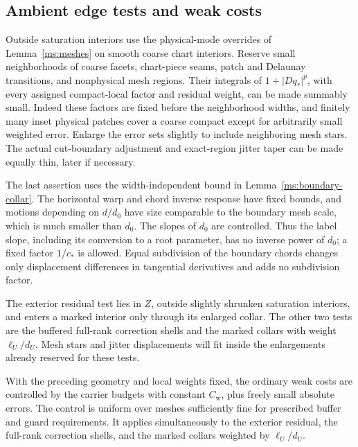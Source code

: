 \subsection{Ambient edge tests and weak costs}
\label{ha:weak-costs}

Outside saturation interiors use the physical-mode overrides of
Lemma~\ref{ms:meshes} on smooth coarse chart interiors.  Reserve small
neighborhoods of coarse facets, chart-piece seams, patch and Delaunay
transitions, and nonphysical mesh regions.  Their integrals of
$1+|Dq_*|^p$, with every assigned compact-local factor and residual
weight, can be made summably small.  Indeed these factors are fixed
before the neighborhood widths, and finitely many inset physical
patches cover a coarse compact except for arbitrarily small weighted
error.  Enlarge the error sets slightly to include neighboring mesh
stars.  The actual cut-boundary adjustment and exact-region jitter
taper can be made equally thin, later if necessary.

The last assertion uses the width-independent bound in
Lemma~\ref{ms:boundary-collar}.  The horizontal warp and chord inverse
response have fixed bounds, and motions depending on $d/d_0$ have
size comparable to the boundary mesh scale, which is much smaller
than $d_0$.  The slopes of $d_0$ are controlled.  Thus the label
slope, including its conversion to a root parameter, has no inverse
power of $d_0$; a fixed factor $1/c_*$ is allowed.  Equal subdivision
of the boundary chords changes only displacement differences in
tangential derivatives and adds no subdivision factor.

The exterior residual test lies in $Z$, outside slightly shrunken
saturation interiors, and enters a marked interior only through
its enlarged collar.  The other two tests are the buffered
full-rank correction shells and the marked collars with weight
$\ell_U/d_U$.  Mesh stars and jitter displacements will fit inside
the enlargements already reserved for these tests.

\begin{lemma}\label{ha:ambient-tests}
With the preceding geometry and local weights fixed, the ordinary
weak costs are controlled by the carrier budgets with constant
$C_{\mathrm w}$, plus freely small absolute errors.  The control is
uniform over meshes sufficiently fine for prescribed buffer and
guard requirements.  It applies simultaneously to the exterior
residual, the full-rank correction shells, and the marked collars
weighted by $\ell_U/d_U$.
\end{lemma}

